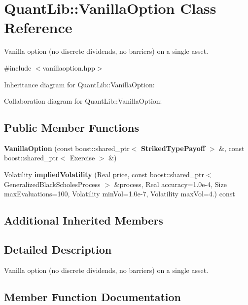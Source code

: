 \section{Quant\+Lib\+:\+:Vanilla\+Option Class Reference}
\label{class_quant_lib_1_1_vanilla_option}


Vanilla option (no discrete dividends, no barriers) on a single asset.  




{\ttfamily \#include $<$vanillaoption.\+hpp$>$}



Inheritance diagram for Quant\+Lib\+:\+:Vanilla\+Option\+:


Collaboration diagram for Quant\+Lib\+:\+:Vanilla\+Option\+:
\subsection*{Public Member Functions}
\begin{DoxyCompactItemize}
\item 
{\bfseries Vanilla\+Option} (const boost\+::shared\+\_\+ptr$<$ {\bf Striked\+Type\+Payoff} $>$ \&, const boost\+::shared\+\_\+ptr$<$ Exercise $>$ \&)\label{class_quant_lib_1_1_vanilla_option_a8109c57c8be7cebf1435d960cbe07541}

\item 
Volatility {\bf implied\+Volatility} (Real price, const boost\+::shared\+\_\+ptr$<$ Generalized\+Black\+Scholes\+Process $>$ \&process, Real accuracy=1.\+0e-\/4, Size max\+Evaluations=100, Volatility min\+Vol=1.\+0e-\/7, Volatility max\+Vol=4.) const 
\end{DoxyCompactItemize}
\subsection*{Additional Inherited Members}


\subsection{Detailed Description}
Vanilla option (no discrete dividends, no barriers) on a single asset. 



\subsection{Member Function Documentation}
